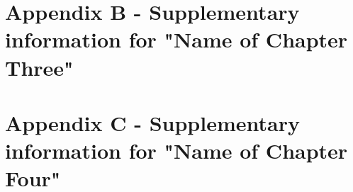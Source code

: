 \documentclass[]{article}
\numberwithin{equation}{section}
\begin{document}
\renewcommand{\thefigure}{A2.\arabic{figure}}
\setcounter{figure}{0}
\renewcommand{\thetable}{A2.\arabic{table}}
\setcounter{table}{0}
\renewcommand{\theequation}{A2.\arabic{equation}}
\setcounter{equation}{0}

\section*{Appendix B - Supplementary information for "Name of Chapter Three"}

\renewcommand{\thefigure}{A3.\arabic{figure}}
\setcounter{figure}{0}
\renewcommand{\thetable}{A3.\arabic{table}}
\setcounter{table}{0}
\renewcommand{\theequation}{A3.\arabic{equation}}
\setcounter{equation}{0}

\section*{Appendix C - Supplementary information for "Name of Chapter Four"}

\renewcommand{\thefigure}{A4.\arabic{figure}}
\setcounter{figure}{0}
\renewcommand{\thetable}{A4.\arabic{table}}
\setcounter{table}{0}
\renewcommand{\theequation}{A4.\arabic{equation}}
\setcounter{equation}{0}
\end{document}
